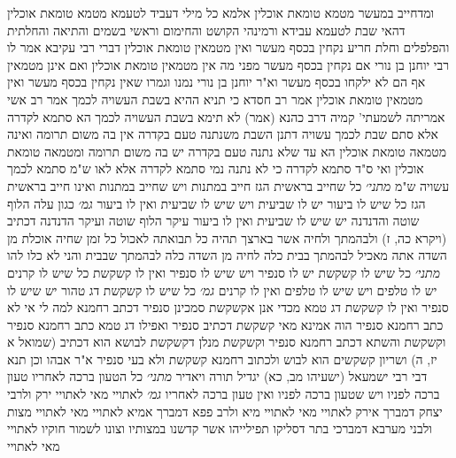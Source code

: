 \documentclass[12pt, openany]{book}
\begin{document}
{ומדחייב במעשר מטמא טומאת אוכלין אלמא כל מילי דעביד לטעמא מטמא טומאת אוכלין דהאי שבת לטעמא עבידא 
ורמינהי הקושט והחימום וראשי בשמים והתיאה והחלתית והפלפלים וחלת חריע נקחין בכסף מעשר ואין מטמאין טומאת אוכלין דברי רבי עקיבא 
אמר לו רבי יוחנן בן נורי אם נקחין בכסף מעשר מפני מה אין מטמאין טומאת אוכלין ואם אינן מטמאין אף הם לא ילקחו בכסף מעשר 
וא"ר יוחנן בן נורי נמנו וגמרו שאין נקחין בכסף מעשר ואין מטמאין טומאת אוכלין 
אמר רב חסדא כי תניא ההיא בשבת העשויה לכמך 
אמר רב אשי אמריתה לשמעתי' קמיה דרב כהנא (אמר) לא תימא בשבת העשויה לכמך הא סתמא לקדרה אלא סתם שבת לכמך עשויה דתנן השבת משנתנה טעם בקדרה אין בה משום תרומה ואינה מטמאה טומאת אוכלין 
הא עד שלא נתנה טעם בקדרה יש בה משום תרומה ומטמאה טומאת אוכלין ואי ס"ד סתמא לקדרה כי לא נתנה נמי סתמא לקדרה אלא לאו ש"מ סתמא לכמך עשויה ש"מ
{\large\emph{מתני׳}} כל שחייב בראשית הגז חייב במתנות ויש שחייב במתנות ואינו חייב בראשית הגז
כל שיש לו ביעור יש לו שביעית ויש שיש לו שביעית ואין לו ביעור
{\large\emph{גמ׳}} כגון עלה הלוף שוטה והדנדנה יש שיש לו שביעית ואין לו ביעור עיקר הלוף שוטה ועיקר הדנדנה
דכתיב (ויקרא כה, ז) ולבהמתך ולחיה אשר בארצך תהיה כל תבואתה לאכול כל זמן שחיה אוכלת מן השדה אתה מאכיל לבהמתך בבית כלה לחיה מן השדה כלה לבהמתך שבבית והני לא כלו להו
{\large\emph{מתני׳}} כל שיש לו קשקשת יש לו סנפיר ויש שיש לו סנפיר ואין לו קשקשת כל שיש לו קרנים יש לו טלפים ויש שיש לו טלפים ואין לו קרנים
{\large\emph{גמ׳}} כל שיש לו קשקשת דג טהור יש שיש לו סנפיר ואין לו קשקשת דג טמא מכדי אנן אקשקשת סמכינן סנפיר דכתב רחמנא למה לי 
אי לא כתב רחמנא סנפיר הוה אמינא מאי קשקשת דכתיב סנפיר ואפילו דג טמא כתב רחמנא סנפיר וקשקשת 
והשתא דכתב רחמנא סנפיר וקשקשת מנלן דקשקשת לבושא הוא דכתיב (שמואל א יז, ה) ושריון קשקשים הוא לבוש 
ולכתוב רחמנא קשקשת ולא בעי סנפיר א"ר אבהו וכן תנא דבי רבי ישמעאל (ישעיהו מב, כא) יגדיל תורה ויאדיר
{\large\emph{מתני׳}} כל הטעון ברכה לאחריו טעון ברכה לפניו ויש שטעון ברכה לפניו ואין טעון ברכה לאחריו
{\large\emph{גמ׳}} לאתויי מאי לאתויי ירק ולרבי יצחק דמברך אירק לאתויי מאי לאתויי מיא 
ולרב פפא דמברך אמיא לאתויי מאי לאתויי מצות ולבני מערבא דמברכי בתר דסליקו תפילייהו אשר קדשנו במצותיו וצונו לשמור חוקיו לאתויי מאי לאתויי}
\end{document}
